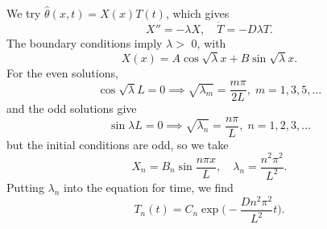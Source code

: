 \documentclass[12pt]{article}
\theoremstyle{definition}
\theoremstyle{remark}
\begin{document}
We try $\hat \theta(x, t) = X(x)T(t)$, which gives
\[
X'' = - \lambda X, \quad \dot T = - D \lambda T
.\]
The boundary conditions imply $\lambda > $ 0, with
\[
	X(x) = A \cos \sqrt \lambda x + B \sin \sqrt \lambda x
.\]
For the even solutions,
\[
	\cos \sqrt \lambda L = 0 \implies \sqrt{\lambda_m} = \frac{m \pi}{2L}, \; m = 1, 3, 5,\ldots
\]
and the odd solutions give
\[
	\sin \lambda L = 0 \implies \sqrt{\lambda_n} = \frac{n \pi}{L}, \; n = 1, 2, 3, \ldots
\]
but the initial conditions are odd, so we take
\[
X_n = B_n \sin \frac{n \pi x}{L}, \quad \lambda_n = \frac{n^2 \pi^2}{L^2}
.\]
Putting $\lambda_n$ into the equation for time, we find
\[
	T_n(t) = C_n \exp \biggl( - \frac{Dn^2\pi^2}{L^2}t \biggr)
.\]

\newpage

\printindex
\end{document}
